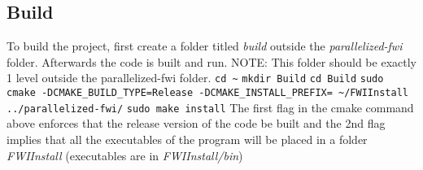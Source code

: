 \documentclass[10pt]{article}
\begin{document}
\subsection{Build}
To build the project, first create a folder titled \textit{build} outside the \textit{parallelized-fwi} folder. Afterwards the code is built and run. NOTE: This folder should be exactly 1 level outside the parallelized-fwi folder.
\newline
\texttt{cd \textasciitilde}
\newline
\texttt{mkdir Build}
\newline
\texttt{cd Build}
\newline
\texttt{sudo cmake -DCMAKE\_BUILD\_TYPE=Release -DCMAKE\_INSTALL\_PREFIX= \textasciitilde/FWIInstall ../parallelized-fwi/}
\newline
\texttt{sudo make install} 
\newline
\noindent The first flag in the cmake command above enforces that the release version of the code be built and the 2nd flag implies that all the executables of the program will be placed in a folder \textit{FWIInstall} (executables are in \textit{FWIInstall/bin})
\end{document}
